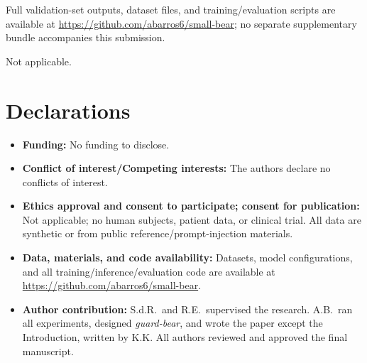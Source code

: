 \documentclass[pdflatex,sn-mathphys-num]{sn-jnl}%
\begin{document}
\backmatter


Full validation-set outputs, dataset files, and training/evaluation scripts are available at \url{https://github.com/abarros6/small-bear}; no separate supplementary bundle accompanies this submission.


Not applicable.

\section*{Declarations}

\begin{itemize}
\item \textbf{Funding:} No funding to disclose.
\item \textbf{Conflict of interest/Competing interests:} The authors declare no conflicts of interest.
\item \textbf{Ethics approval and consent to participate; consent for publication:} Not applicable; no human subjects, patient data, or clinical trial. All data are synthetic or from public reference/prompt-injection materials.
\item \textbf{Data, materials, and code availability:} Datasets, model configurations, and all training/inference/evaluation code are available at \url{https://github.com/abarros6/small-bear}.
\item \textbf{Author contribution:} S.d.R.\ and R.E.\ supervised the research. A.B.\ ran all experiments, designed \textit{guard-bear}, and wrote the paper except the Introduction, written by K.K. All authors reviewed and approved the final manuscript.
\end{itemize}
\end{document}
